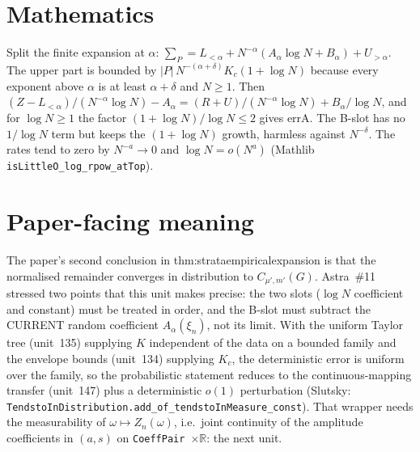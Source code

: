 \documentclass[11pt]{article}
\begin{document}
\section{Mathematics}
Split the finite expansion at $\alpha$: $\sum_P=L_{<\alpha}+N^{-\alpha}(A_\alpha\log N+B_\alpha)+U_{>\alpha}$.
The upper part is bounded by $|P|\,N^{-(\alpha+\delta)}K_c(1+\log N)$ because every exponent above
$\alpha$ is at least $\alpha+\delta$ and $N\ge1$. Then
$(Z-L_{<\alpha})/(N^{-\alpha}\log N)-A_\alpha=(R+U)/(N^{-\alpha}\log N)+B_\alpha/\log N$, and for
$\log N\ge1$ the factor $(1+\log N)/\log N\le2$ gives $\mathrm{errA}$. The B-slot has no
$1/\log N$ term but keeps the $(1+\log N)$ growth, harmless against $N^{-\delta}$. The rates tend to
zero by $N^{-a}\to0$ and $\log N=o(N^a)$ (Mathlib \texttt{isLittleO\_log\_rpow\_atTop}).

\section{Paper-facing meaning}
The paper's second conclusion in thm:strataempiricalexpansion is that the normalised remainder
converges in distribution to $C_{\mu',m'}(G)$. Astra~\#11 stressed two points that this unit makes
precise: the two slots ($\log N$ coefficient and constant) must be treated in order, and the
B-slot must subtract the CURRENT random coefficient $A_\alpha(\xi_n)$, not its limit. With the
uniform Taylor tree (unit~135) supplying $K$ independent of the data on a bounded family and the
envelope bounds (unit~134) supplying $K_c$, the deterministic error is uniform over the family, so
the probabilistic statement reduces to the continuous-mapping transfer (unit~147) plus a
deterministic $o(1)$ perturbation (Slutsky: \texttt{TendstoInDistribution.add\_of\_tendstoInMeasure\_const}).
That wrapper needs the measurability of $\omega\mapsto Z_n(\omega)$, i.e.\ joint continuity of the
amplitude coefficients in $(a,s)$ on \texttt{CoeffPair}~$\times\mathbb R$: the next unit.
\end{document}
